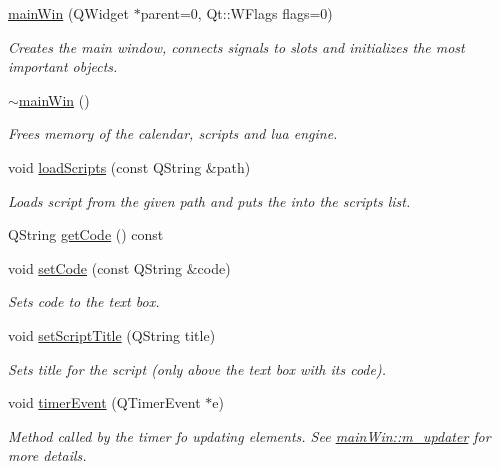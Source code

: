 \begin{DoxyCompactItemize}
\item 
\hyperlink{classmain_win_a837aa6380bc037afd022629b56b7aca9}{main\-Win} (Q\-Widget $\ast$parent=0, Qt\-::\-W\-Flags flags=0)
\begin{DoxyCompactList}\small\item\em Creates the main window, connects signals to slots and initializes the most important objects. \end{DoxyCompactList}\item 
\hyperlink{classmain_win_a70326ccd243eb2060b1b5a3150025a9d}{$\sim$main\-Win} ()
\begin{DoxyCompactList}\small\item\em Frees memory of the calendar, scripts and lua engine. \end{DoxyCompactList}\item 
void \hyperlink{classmain_win_a3a1257aa1b06a426b08763a72756f06a}{load\-Scripts} (const Q\-String \&path)
\begin{DoxyCompactList}\small\item\em Loads script from the given path and puts the into the scripts list. \end{DoxyCompactList}\item 
Q\-String \hyperlink{classmain_win_abeb1092d0b748df7ceaeb13334a89030}{get\-Code} () const 
\item 
void \hyperlink{classmain_win_afe80ea88b1fb5e13d56acfddf6fee0e6}{set\-Code} (const Q\-String \&code)
\begin{DoxyCompactList}\small\item\em Sets code to the text box. \end{DoxyCompactList}\item 
void \hyperlink{classmain_win_aa70a0f3f1c66ffa1a7d4012526b56c44}{set\-Script\-Title} (Q\-String title)
\begin{DoxyCompactList}\small\item\em Sets title for the script (only above the text box with its code). \end{DoxyCompactList}\item 
void \hyperlink{classmain_win_a5d97000005953e9adbda7c98602a5ae9}{timer\-Event} (Q\-Timer\-Event $\ast$e)
\begin{DoxyCompactList}\small\item\em Method called by the timer fo updating elements. See \hyperlink{classmain_win_a079d09aeafe1af36f8f0d1bd4d88d803}{main\-Win\-::m\-\_\-updater} for more details. \end{DoxyCompactList}\end{DoxyCompactItemize}
